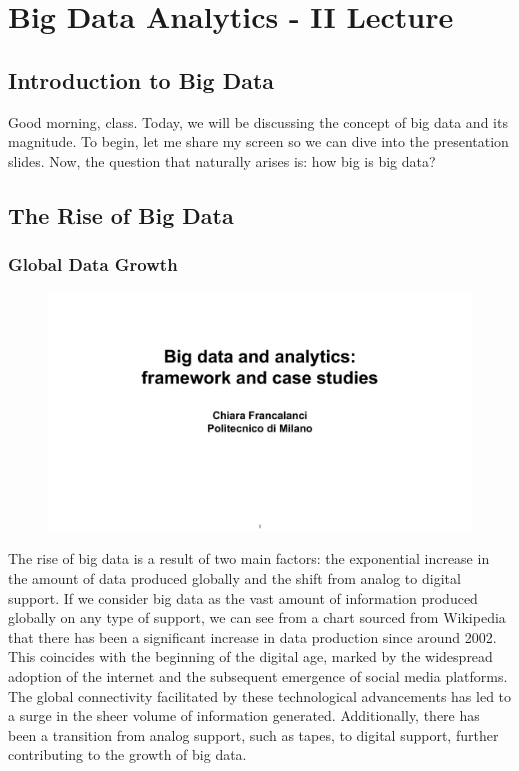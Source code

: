 \section{Big Data Analytics - II Lecture}

\subsection{Introduction to Big Data}

Good morning, class. Today, we will be discussing the concept of big
data and its magnitude. To begin, let me share my screen so we can dive
into the presentation slides. Now, the question that naturally arises
is: how big is big data?

\subsection{The Rise of Big Data}

\subsubsection{Global Data Growth}

\begin{figure}[!h]
    \centering
    \includegraphics[page=26, trim = 1.3cm 0.7cm 1.5cm 3.5cm, clip, width=\textwidth]{images/06 - BIG_DATA.pdf}
\end{figure}

The rise of big data is a result of two main factors: the exponential
increase in the amount of data produced globally and the shift from
analog to digital support. If we consider big data as the vast amount of
information produced globally on any type of support, we can see from a
chart sourced from Wikipedia that there has been a significant increase
in data production since around 2002. This coincides with the beginning
of the digital age, marked by the widespread adoption of the internet
and the subsequent emergence of social media platforms. The global
connectivity facilitated by these technological advancements has led to
a surge in the sheer volume of information generated. Additionally,
there has been a transition from analog support, such as tapes, to
digital support, further contributing to the growth of big data.

